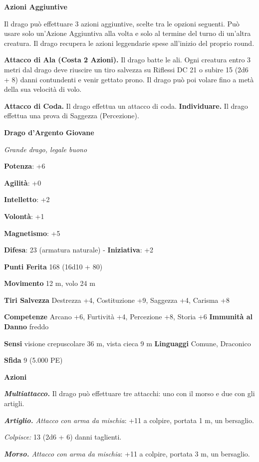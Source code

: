 \begin{multicols}{2}
\textbf{Azioni Aggiuntive}

Il drago può effettuare 3 azioni aggiuntive, scelte tra le opzioni
seguenti. Può usare solo un'Azione Aggiuntiva alla volta e solo al
termine del turno di un'altra creatura. Il drago recupera le azioni
leggendarie spese all'inizio del proprio round.

\textbf{Attacco di Ala (Costa 2 Azioni).} Il drago batte le ali. Ogni
creatura entro 3 metri dal drago deve riuscire un tiro salvezza su Riflessi DC 21 o subire 15 (2d6 + 8) danni contundenti e venir gettato
prono. Il drago può poi volare fino a metà della sua velocità di volo.

\textbf{Attacco di Coda.} Il drago effettua un attacco di coda.
\textbf{Individuare.} Il drago effettua una prova di Saggezza
(Percezione).

\textbf{Drago d'Argento Giovane}

\emph{Grande drago, legale buono}

\textbf{Potenza}: +6

\textbf{Agilità}: +0

\textbf{Intelletto}: +2

\textbf{Volontà}: +1

\textbf{Magnetismo}: +5

\textbf{Difesa}: 23 (armatura naturale) - \textbf{Iniziativa}: +2

\textbf{Punti Ferita} 168 (16d10 + 80)

\textbf{Movimento} 12 m, volo 24 m

\textbf{Tiri Salvezza} Destrezza +4, Costituzione +9, Saggezza +4,
Carisma +8

\textbf{Competenze} Arcano +6, Furtività +4, Percezione +8, Storia +6
\textbf{Immunità al Danno} freddo

\textbf{Sensi} visione crepuscolare 36 m, vista cieca 9 m
\textbf{Linguaggi} Comune, Draconico

\textbf{Sfida} 9 (5.000 PE)\smallskip

\smallskip\textbf{Azioni}

\emph{\textbf{Multiattacco.}} Il drago può effettuare tre attacchi: uno
con il morso e due con gli artigli.

\emph{\textbf{Artiglio.} Attacco con arma da mischia}: +11 a colpire,
portata 1 m, un bersaglio.

\emph{Colpisce:} 13 (2d6 + 6) danni taglienti.

\emph{\textbf{Morso.} Attacco con arma da mischia}: +11 a colpire,
portata 3 m, un bersaglio.


\end{multicols}
